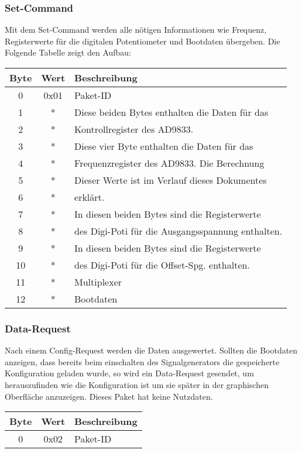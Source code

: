 \documentclass[a4paper,12pt]{article}
\begin{document}
\subsubsection{Set-Command}
Mit dem Set-Command werden alle nötigen Informationen wie Frequenz, Registerwerte für die digitalen Potentiometer und Bootdaten übergeben. Die Folgende Tabelle zeigt den Aufbau:
\linebreak

\begin{flushleft}
\begin{tabular}{c||c|l}
Byte & Wert & Beschreibung \\
\hline
\hline
0 & 0x01 & Paket-ID \\
\hline
1 & * & Diese beiden Bytes enthalten die Daten für das \\
2 & * & Kontrollregister des AD9833.\\
\hline
3 & * & Diese vier Byte enthalten die Daten für das \\
4 & * & Frequenzregister des AD9833. Die Berechnung \\
5 & * & Dieser Werte ist im Verlauf dieses Dokumentes \\
6 & * & erklärt.\\
\hline
7 & * & In diesen beiden Bytes sind die Registerwerte \\
8 & * & des Digi-Poti für die Ausgangsspannung enthalten.\\
\hline
9 & * & In diesen beiden Bytes sind die Registerwerte \\
10 & * & des Digi-Poti für die Offset-Spg. enthalten.\\
\hline
11 & * & Multiplexer\\
\hline
12 & * & Bootdaten\\

\end{tabular}
\end{flushleft}

\subsubsection{Data-Request}
Nach einem Config-Request werden die Daten ausgewertet. Sollten die Bootdaten anzeigen, dass bereits beim einschalten des Signalgenerators die gespeicherte Konfiguration geladen wurde, so wird ein Data-Request gesendet, um herauszufinden wie die Konfiguration ist um sie später in der graphischen Oberfläche anzuzeigen. Dieses Paket hat keine Nutzdaten.
\begin{flushleft}
\begin{tabular}{c||c|l}
Byte & Wert & Beschreibung \\
\hline
\hline
0 & 0x02 & Paket-ID \\

\end{tabular}
\end{flushleft}
\end{document}

